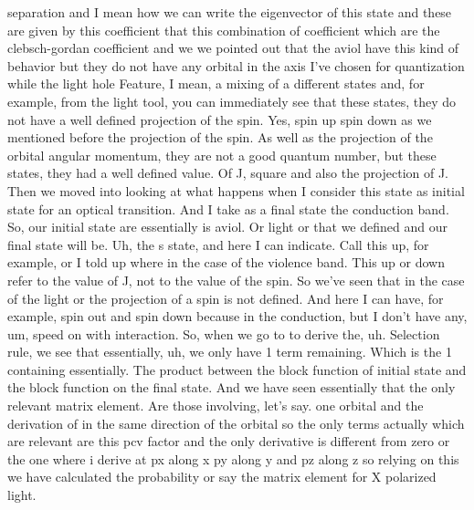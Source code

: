 separation and I mean how we can write the eigenvector of this state and these are given by this coefficient that this combination of coefficient which are the clebsch-gordan coefficient and we we pointed out that the aviol have this kind of behavior but they do not have any orbital in the axis I've chosen for quantization while the light hole Feature, I mean, a mixing of a different states and, for example, from the light tool, you can immediately see that these states, they do not have a well defined projection of the spin. Yes, spin up spin down as we mentioned before the projection of the spin. As well as the projection of the orbital angular momentum, they are not a good quantum number, but these states, they had a well defined value. Of J, square and also the projection of J. Then we moved into looking at what happens when I consider this state as initial state for an optical transition. And I take as a final state the conduction band. So, our initial state are essentially is aviol. Or light or that we defined and our final state will be. Uh, the s state, and here I can indicate. Call this up, for example, or I told up where in the case of the violence band. This up or down refer to the value of J, not to the value of the spin. So we've seen that in the case of the light or the projection of a spin is not defined. And here I can have, for example, spin out and spin down because in the conduction, but I don't have any, um, speed on with interaction. So, when we go to to derive the, uh. Selection rule, we see that essentially, uh, we only have 1 term remaining. Which is the 1 containing essentially. The product between the block function of initial state and the block function on the final state. And we have seen essentially that the only relevant matrix element. Are those involving, let's say. one orbital and the derivation of in the same direction of the orbital so the only terms actually which are relevant are this pcv factor and the only derivative is different from zero or the one where i derive at px along x py along y and pz along z so relying on this we have calculated the probability or say the matrix element for X polarized light.
